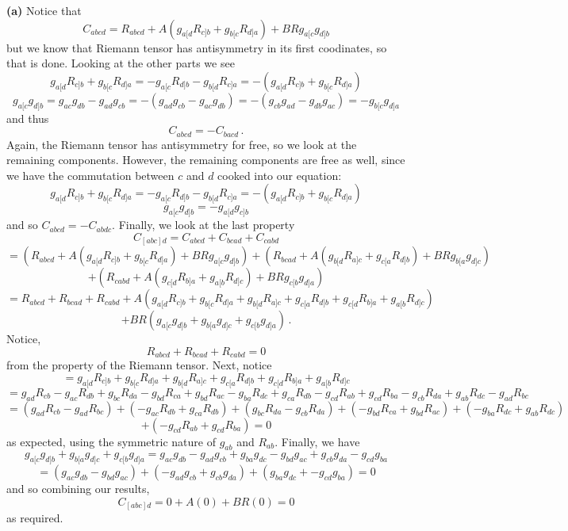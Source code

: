 \documentclass[10pt]{article}
\begin{document}
\textbf{(a)} Notice that
\[ C_{abcd} = R_{abcd} + A(g_{a[d}R_{c]b} + g_{b[c}R_{d]a}) + BRg_{a[c}g_{d]b} \]
but we know that Riemann tensor has antisymmetry in its first coodinates, so that is done. Looking at the other parts we see
\[ g_{a[d}R_{c]b} + g_{b[c}R_{d]a} = -g_{a[c}R_{d]b} - g_{b[d}R_{c]a} = - (g_{a[d}R_{c]b} + g_{b[c}R_{d]a}) \]
\[ g_{a[c}g_{d]b} = g_{ac}g_{db} - g_{ad}g_{cb} = -(g_{ad}g_{cb} - g_{ac}g_{db}) = -(g_{cb}g_{ad} - g_{db}g_{ac}) = -g_{b[c}g_{d]a} \]
and thus
\[ C_{abcd} = -C_{bacd} \, .\]
Again, the Riemann tensor has antisymmetry for free, so we look at the remaining components. However, the remaining components are free as well, since we have the commutation between $c$ and $d$ cooked into our equation:
\[ g_{a[d}R_{c]b} + g_{b[c}R_{d]a} = -g_{a[c}R_{d]b} - g_{b[d}R_{c]a} = - (g_{a[d}R_{c]b} + g_{b[c}R_{d]a}) \]
\[ g_{a[c}g_{d]b} = -g_{a[d}g_{c]b} \]
and so $C_{abcd} = -C_{abdc}$. Finally, we look at the last property
\[ C_{[abc]d} = C_{abcd} + C_{bcad} + C_{cabd}\]
\[ = (R_{abcd} + A(g_{a[d}R_{c]b} + g_{b[c}R_{d]a}) + BRg_{a[c}g_{d]b}) + (R_{bcad} + A(g_{b[d}R_{a]c} + g_{c[a}R_{d]b}) + BRg_{b[a}g_{d]c})\]
\[ + (R_{cabd} + A(g_{c[d}R_{b]a} + g_{a[b}R_{d]c}) + BRg_{c[b}g_{d]a}) \]
\[ = R_{abcd} + R_{bcad} + R_{cabd} + A\left(g_{a[d}R_{c]b} + g_{b[c}R_{d]a} + g_{b[d}R_{a]c} + g_{c[a}R_{d]b} + g_{c[d}R_{b]a} + g_{a[b}R_{d]c}\right) \]
\[ + BR(g_{a[c}g_{d]b} + g_{b[a}g_{d]c} + g_{c[b}g_{d]a}) \, .\]
Notice,
\[ R_{abcd} + R_{bcad} + R_{cabd} = 0\]
from the property of the Riemann tensor. Next, notice
\[ = g_{a[d}R_{c]b} + g_{b[c}R_{d]a} + g_{b[d}R_{a]c} + g_{c[a}R_{d]b} + g_{c[d}R_{b]a} + g_{a[b}R_{d]c} \]
\[ = g_{ad}R_{cb} - g_{ac}R_{db} + g_{bc}R_{da} - g_{bd}R_{ca} + g_{bd}R_{ac} - g_{ba}R_{dc} + g_{ca}R_{db} - g_{cd}R_{ab} + g_{cd}R_{ba} - g_{cb}R_{da} + g_{ab}R_{dc} - g_{ad}R_{bc} \]
\[ = (g_{ad}R_{cb} - g_{ad}R_{bc}) + (- g_{ac}R_{db} + g_{ca}R_{db}) + (g_{bc}R_{da} - g_{cb}R_{da}) + (- g_{bd}R_{ca} + g_{bd}R_{ac}) + (- g_{ba}R_{dc} + g_{ab}R_{dc}) \]
\[ + (- g_{cd}R_{ab} + g_{cd}R_{ba}) = 0 \]
as expected, using the symmetric nature of $g_{ab}$ and $R_{ab}$. Finally, we have
\[ g_{a[c}g_{d]b} + g_{b[a}g_{d]c} + g_{c[b}g_{d]a} = g_{ac}g_{db} - g_{ad}g_{cb} + g_{ba}g_{dc} - g_{bd}g_{ac} + g_{cb}g_{da} - g_{cd}g_{ba}\]
\[ = (g_{ac}g_{db} - g_{bd}g_{ac}) + (- g_{ad}g_{cb} + g_{cb}g_{da}) + (g_{ba}g_{dc} + - g_{cd}g_{ba}) = 0\]
and so combining our results,
\[ C_{[abc]d} = 0 + A(0) + BR(0) = 0 \]
as required.
\end{document}
